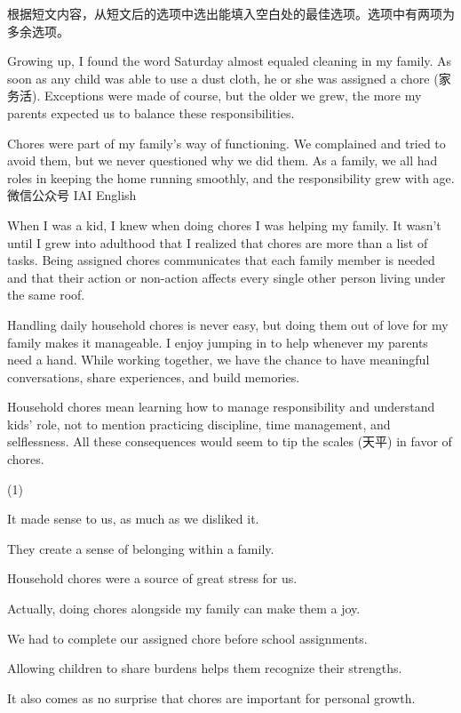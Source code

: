 \documentclass{英语试卷}
\begin{document}
\par 根据短文内容，从短文后的选项中选出能填入空白处的最佳选项。选项中有两项为多余选项。\par
\par Growing up, I found the word Saturday almost equaled cleaning in my family. As soon as any child was able to use a dust cloth, he or she was assigned a chore (家务活).  Exceptions were made of course, but the older we grew, the more my parents expected us to balance these responsibilities.\par
\par Chores were part of my family's way of functioning. We complained and tried to avoid them, but we never questioned why we did them. As a family, we all had roles in keeping the home running smoothly, and the responsibility grew with age.  微信公众号 IAI English\par
\par When I was a kid, I knew when doing chores I was helping my family. It wasn't until I grew into adulthood that I realized that chores are more than a list of tasks.  Being assigned chores communicates that each family member is needed and that their action or non-action affects every single other person living under the same roof.\par
\par Handling daily household chores is never easy, but doing them out of love for my family makes it manageable.  I enjoy jumping in to help whenever my parents need a hand. While working together, we have the chance to have meaningful conversations, share experiences, and build memories.\par
\par {} Household chores mean learning how to manage responsibility and understand kids' role, not to mention practicing discipline, time management, and selflessness. All these consequences would seem to tip the scales (天平) in favor of chores.\par
\begin{choices}(1)
  \item It made sense to us, as much as we disliked it.
  \item They create a sense of belonging within a family.
  \item Household chores were a source of great stress for us.
  \item Actually, doing chores alongside my family can make them a joy.
  \item We had to complete our assigned chore before school assignments.
  \item Allowing children to share burdens helps them recognize their strengths.
  \item It also comes as no surprise that chores are important for personal growth.
\end{choices}
\end{document}

